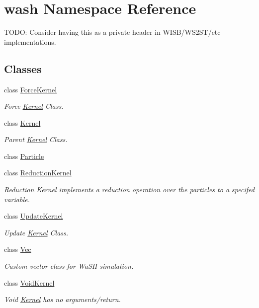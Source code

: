 \hypertarget{namespacewash}{}\section{wash Namespace Reference}
\label{namespacewash}


T\+O\+DO\+: Consider having this as a private header in W\+I\+S\+B/\+W\+S2\+S\+T/etc implementations.  


\subsection*{Classes}
\begin{DoxyCompactItemize}
\item 
class \mbox{\hyperlink{classwash_1_1ForceKernel}{Force\+Kernel}}
\begin{DoxyCompactList}\small\item\em Force \mbox{\hyperlink{classwash_1_1Kernel}{Kernel}} Class. \end{DoxyCompactList}\item 
class \mbox{\hyperlink{classwash_1_1Kernel}{Kernel}}
\begin{DoxyCompactList}\small\item\em Parent \mbox{\hyperlink{classwash_1_1Kernel}{Kernel}} Class. \end{DoxyCompactList}\item 
class \mbox{\hyperlink{classwash_1_1Particle}{Particle}}
\item 
class \mbox{\hyperlink{classwash_1_1ReductionKernel}{Reduction\+Kernel}}
\begin{DoxyCompactList}\small\item\em Reduction \mbox{\hyperlink{classwash_1_1Kernel}{Kernel}} implements a reduction operation over the particles to a specifed variable. \end{DoxyCompactList}\item 
class \mbox{\hyperlink{classwash_1_1UpdateKernel}{Update\+Kernel}}
\begin{DoxyCompactList}\small\item\em Update \mbox{\hyperlink{classwash_1_1Kernel}{Kernel}} Class. \end{DoxyCompactList}\item 
class \mbox{\hyperlink{classwash_1_1Vec}{Vec}}
\begin{DoxyCompactList}\small\item\em Custom vector class for Wa\+SH simulation. \end{DoxyCompactList}\item 
class \mbox{\hyperlink{classwash_1_1VoidKernel}{Void\+Kernel}}
\begin{DoxyCompactList}\small\item\em Void \mbox{\hyperlink{classwash_1_1Kernel}{Kernel}} has no arguments/return. \end{DoxyCompactList}\end{DoxyCompactItemize}
